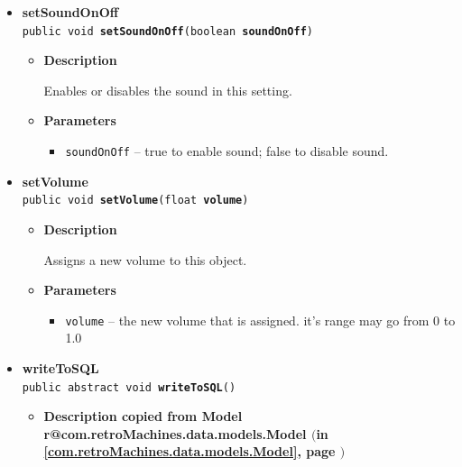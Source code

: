 \documentclass[11pt,a4paper]{report}
\makeatletter
\newcommand{\refdefined}[1]{
\expandafter\ifx\csname r@#1\endcsname\relax
\relax\else
{$($in \ref{#1}, page \pageref{#1}$)$}\fi}
\makeatother
\begin{document}
{{{{{{\begin{itemize}
{\begin{itemize}
{Set left control to this setting.
}
\item{
{\bf  Parameters}
  \begin{itemize}
   \item{
\texttt{leftControl} -- true if left control shall be enabled; false otherwise}
  \end{itemize}
}%
\end{itemize}
}%
\item{ 
{\bf  setSoundOnOff}\\
\texttt{public void\ {\bf  setSoundOnOff}(\texttt{boolean} {\bf  soundOnOff})
\label{com.retroMachines.data.models.Setting.setSoundOnOff(boolean)}}%
\begin{itemize}
\item{
{\bf  Description}

Enables or disables the sound in this setting.
}
\item{
{\bf  Parameters}
  \begin{itemize}
   \item{
\texttt{soundOnOff} -- true to enable sound; false to disable sound.}
  \end{itemize}
}%
\end{itemize}
}%
\item{ 
{\bf  setVolume}\\
\texttt{public void\ {\bf  setVolume}(\texttt{float} {\bf  volume})
\label{com.retroMachines.data.models.Setting.setVolume(float)}}%
\begin{itemize}
\item{
{\bf  Description}

Assigns a new volume to this object.
}
\item{
{\bf  Parameters}
  \begin{itemize}
   \item{
\texttt{volume} -- the new volume that is assigned. it's range may go from 0 to 1.0}
  \end{itemize}
}%
\end{itemize}
}%
\item{ 
{\bf  writeToSQL}\\
\texttt{public abstract void\ {\bf  writeToSQL}()
\label{com.retroMachines.data.models.Setting.writeToSQL()}}%
\begin{itemize}
\item{
{\bf  Description copied from Model{\small \refdefined{com.retroMachines.data.models.Model}} }

}
\end{itemize}}
\end{itemize}}}}}}}
\end{document}
